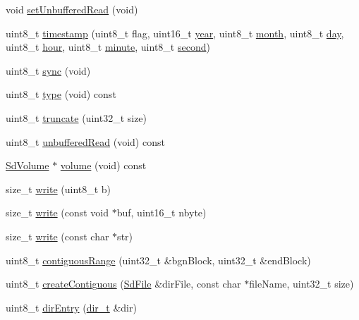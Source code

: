 \begin{DoxyCompactItemize}
\item 
void \hyperlink{class_sd_file_a08c9e76a4a7bb43fccf1dd5c72c66a16}{set\+Unbuffered\+Read} (void)
\item 
uint8\+\_\+t \hyperlink{class_sd_file_a249632ba9580c556c0b041d6b2aaf224}{timestamp} (uint8\+\_\+t flag, uint16\+\_\+t \hyperlink{_time_8cpp_a8608865f8292c0505e02b67fd1cf39e8}{year}, uint8\+\_\+t \hyperlink{_time_8cpp_a726c707dded9d78cf076554eceb956ec}{month}, uint8\+\_\+t \hyperlink{_time_8cpp_a51dcd9f072551ba8f47449a4e7f78c29}{day}, uint8\+\_\+t \hyperlink{_time_8cpp_ac4706d0cffc9e111a6c6a757b462e88e}{hour}, uint8\+\_\+t \hyperlink{_time_8cpp_a88285e3771bcb970424122a6ee4b40fa}{minute}, uint8\+\_\+t \hyperlink{_time_8cpp_a10a4dd811353baa12dadadee7c7e5099}{second})
\item 
uint8\+\_\+t \hyperlink{class_sd_file_a742d64ca964583ac3a92b31f0eba5e14}{sync} (void)
\item 
uint8\+\_\+t \hyperlink{class_sd_file_a2da736b480e64ec2142687fb49871ada}{type} (void) const
\item 
uint8\+\_\+t \hyperlink{class_sd_file_ade1e2b72f89b24f500502518fd678abd}{truncate} (uint32\+\_\+t size)
\item 
uint8\+\_\+t \hyperlink{class_sd_file_a151bbc9fa7787b67f3d4a3574f9bc9e3}{unbuffered\+Read} (void) const
\item 
\hyperlink{class_sd_volume}{Sd\+Volume} $\ast$ \hyperlink{class_sd_file_a85578a1addda7cdba336a5b10deafcf5}{volume} (void) const
\item 
size\+\_\+t \hyperlink{class_sd_file_a67267a4b63d03a16e099195935613006}{write} (uint8\+\_\+t b)
\item 
size\+\_\+t \hyperlink{class_sd_file_a94d4541fda63b5390c8e97ebe815115a}{write} (const void $\ast$buf, uint16\+\_\+t nbyte)
\item 
size\+\_\+t \hyperlink{class_sd_file_ad74aaa9115724d663ee39e6dd2d808f8}{write} (const char $\ast$str)
\item 
uint8\+\_\+t \hyperlink{class_sd_file_a872927812be6c48a894bdfc72f1701a1}{contiguous\+Range} (uint32\+\_\+t \&bgn\+Block, uint32\+\_\+t \&end\+Block)
\item 
uint8\+\_\+t \hyperlink{class_sd_file_a231dd495e5c5997aea2a842481a68f40}{create\+Contiguous} (\hyperlink{class_sd_file}{Sd\+File} \&dir\+File, const char $\ast$file\+Name, uint32\+\_\+t size)
\item 
uint8\+\_\+t \hyperlink{class_sd_file_ae7b4b1057a1ee17f673c116771636156}{dir\+Entry} (\hyperlink{_fat_structs_8h_a803db59d4e16a0c54a647afc6a7954e3}{dir\+\_\+t} \&dir)

\end{DoxyCompactItemize}
